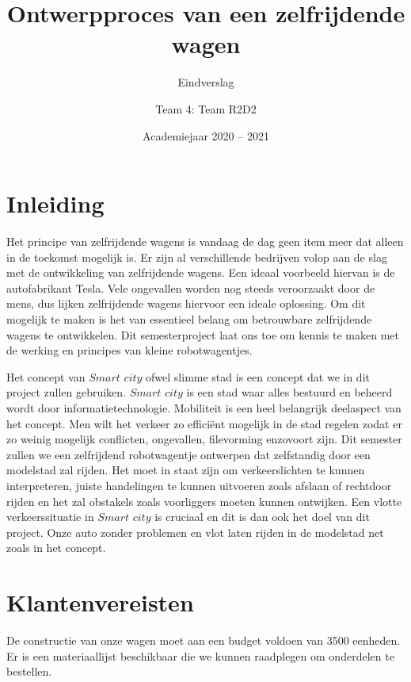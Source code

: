\documentclass[a4paper,twoside,kulak]{kulakreport}
\title{Ontwerpproces van een zelfrijdende wagen}
\subtitle{Eindverslag}
\author{Team 4: Team R2D2}
\institute{Matthijs Deforche, Karl Van Holder, Thomas Varheust, Kobe De Weerdt, Yaron Verhulst \\ Kevin Truyaert, Benjamin Maveau, Martijn Boussé}
\date{Academiejaar 2020 -- 2021}
\begin{document}
	\titlepage
	
	
	
	\renewcommand*\contentsname{Inhoud}
	\tableofcontents
	

	\newpage
	
	\section{Inleiding}
	
	Het principe van zelfrijdende wagens is vandaag de dag geen item meer dat alleen in de toekomst mogelijk is. Er zijn al verschillende bedrijven volop aan de slag met de ontwikkeling van zelfrijdende wagens. Een ideaal voorbeeld hiervan is de autofabrikant Tesla. Vele ongevallen worden nog steeds veroorzaakt door de mens, dus lijken zelfrijdende wagens hiervoor een ideale oplossing. Om dit mogelijk te maken is het van essentieel belang om betrouwbare zelfrijdende wagens te ontwikkelen. Dit semesterproject laat ons toe om kennis te maken met de werking en principes van kleine robotwagentjes. 
	
	Het concept van $Smart$ $city$ ofwel slimme stad is een concept dat we in dit project zullen gebruiken.  $Smart$ $city$ is een stad waar alles bestuurd en beheerd wordt door informatietechnologie. Mobiliteit is een heel belangrijk deelaspect van het concept. Men wilt het verkeer zo efficiënt mogelijk in de stad regelen zodat er zo weinig mogelijk conflicten, ongevallen, filevorming enzovoort zijn.  Dit semester zullen we een zelfrijdend robotwagentje ontwerpen dat zelfstandig door een modelstad zal rijden. Het moet in staat zijn om verkeerslichten te kunnen interpreteren, juiste handelingen te kunnen uitvoeren zoals afslaan of rechtdoor rijden en het zal obstakels zoals voorliggers moeten kunnen ontwijken. Een vlotte verkeerssituatie in $Smart$ $city$ is cruciaal en dit is dan ook het doel van dit project. Onze auto zonder problemen en vlot laten rijden in de modelstad net zoals in het concept. 

	
	\newpage
	
	
	\section{Klantenvereisten}

	De constructie van onze wagen moet aan een budget voldoen van 3500 eenheden. Er is een materiaallijst beschikbaar die we kunnen raadplegen om onderdelen te bestellen. \\
\end{document}

